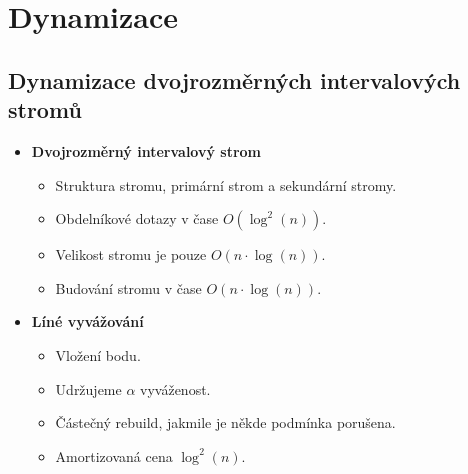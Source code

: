 \documentclass[11pt,a4paper]{article}
\begin{document}
\section{Dynamizace}
\subsection{Dynamizace dvojrozměrných intervalových stromů}
\begin{itemize}
    \item \textbf{Dvojrozměrný intervalový strom}
    \begin{itemize}
        \item Struktura stromu, primární strom a sekundární stromy.
        \item Obdelníkové dotazy v čase $O(\log^2(n))$.
        \item Velikost stromu je pouze $O(n\cdot \log(n))$.
        \item Budování stromu v čase $O(n\cdot \log(n))$.
    \end{itemize}
    \item \textbf{Líné vyvážování}
    \begin{itemize}
        \item Vložení bodu.
        \item Udržujeme $\alpha$ vyváženost.
        \item Částečný rebuild, jakmile je někde podmínka porušena.
        \item Amortizovaná cena $\log^2(n)$.
    \end{itemize}
\end{itemize}
\end{document}
